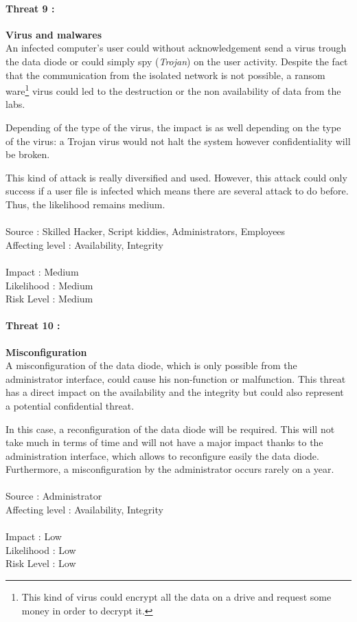 \documentclass[a4paper,10pt]{article}
\begin{document}
\paragraph{Threat 9 :}  \textbf{Virus and malwares} \\
\indent An infected computer's user could without acknowledgement send a virus trough the data diode or could simply spy (\emph{Trojan}) on the user activity. Despite the fact that the communication from the isolated network is not possible, a ransom ware\footnote{This kind of virus could encrypt all the data on a drive and request some money in order to decrypt it.} virus could led to the destruction or the non availability of data from the labs.

Depending of the type of the virus, the impact is as well depending on the type of the virus: a Trojan virus would not halt the system however confidentiality will be broken. 

This kind of attack is really diversified and used. However, this attack could only success if a user file is infected which means there are several attack to do before. Thus, the likelihood remains medium. \\ \\
Source : Skilled Hacker, Script kiddies, Administrators, Employees  \\ 
Affecting level : Availability, Integrity \\ \\
Impact : Medium \\
Likelihood : Medium \\
Risk Level : Medium

\paragraph{Threat 10 :}  \textbf{Misconfiguration} \\
\indent A misconfiguration of the data diode, which is only possible from the administrator interface, could cause his non-function or malfunction. This threat has a direct impact on the availability and the integrity but could also represent a potential confidential threat.

In this case, a reconfiguration of the data diode will be required. This will not take much in terms of time and will not have a major impact thanks to the administration interface, which allows to reconfigure easily the data diode. Furthermore, a misconfiguration by the administrator occurs rarely on a year.\\ \\ 
Source : Administrator \\ 
Affecting level : Availability, Integrity \\ \\
Impact : Low \\
Likelihood : Low \\
Risk Level : Low
\end{document}

